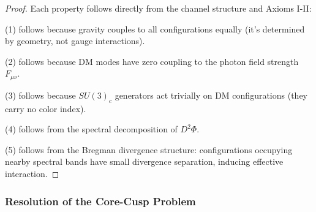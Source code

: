 \begin{lemma}
\begin{enumerate}
\end{enumerate}

\begin{proof}
Each property follows directly from the channel structure and Axioms I-II:

(1) follows because gravity couples to all configurations equally (it's determined by geometry, not gauge interactions).

(2) follows because DM modes have zero coupling to the photon field strength $F_{\mu\nu}$.

(3) follows because $SU(3)_c$ generators act trivially on DM configurations (they carry no color index).

(4) follows from the spectral decomposition of $D^2\Phi$.

(5) follows from the Bregman divergence structure: configurations occupying nearby spectral bands have small divergence separation, inducing effective interaction.

\end{proof}

\end{lemma}

\subsubsection{Resolution of the Core-Cusp Problem}
\label{subsubsec:coreCuspResolution}

